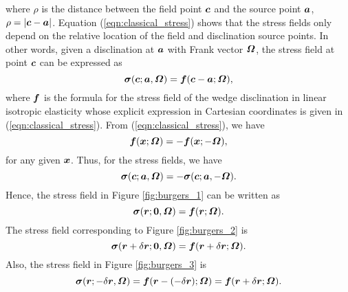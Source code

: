 \documentclass[11pt,letterpaper]{article}
\begin{document}
where $\rho$ is the distance between the field point $\bfc$ and the source point $\bfa$, $\rho=|\bfc-\bfa|$. Equation (\ref{eqn:classical_stress}) shows that the stress fields only depend on the relative location of the field and disclination source points. In other words, given a disclination at $\bfa$ with Frank vector $\bfOmega$, the stress field at point $\bfc$ can be expressed as
\begin{equation*}
\bfsigma(\bfc; \bfa, \bfOmega) = \bff(\bfc-\bfa; \bfOmega),
\end{equation*}
where $\bff$ is the formula for the stress field of the wedge disclination in linear isotropic elasticity whose explicit expression in Cartesian coordinates is given in (\ref{eqn:classical_stress}). From (\ref{eqn:classical_stress}), we have
\begin{equation}\label{eqn:f_property}
\bff(\bfx;\bfOmega) = -\bff(\bfx;-\bfOmega),
\end{equation}
for any given $\bfx$. Thus, for the stress fields, we have
\begin{equation*}
\bfsigma(\bfc;\bfa,\bfOmega) = -\bfsigma(\bfc;\bfa,-\bfOmega).
\end{equation*}
Hence, the stress field in Figure \ref{fig:burgers_1} can be written as 
\begin{equation*}
\bfsigma(\bfr;\bf0,\bfOmega) = \bff(\bfr; \bfOmega).
\end{equation*}
The stress field corresponding to Figure \ref{fig:burgers_2} is 
\begin{equation*}
\bfsigma(\bfr+\delta\bfr;\textbf{0},\bfOmega) = \bff(\bfr+\delta\bfr;\bfOmega).
\end{equation*}
Also, the stress field in Figure \ref{fig:burgers_3} is 
\begin{equation*}
\bfsigma(\bfr;-\delta\bfr, \bfOmega) = \bff(\bfr- (-\delta\bfr); \bfOmega) = \bff(\bfr+\delta\bfr; \bfOmega).
\end{equation*}
\end{document}
